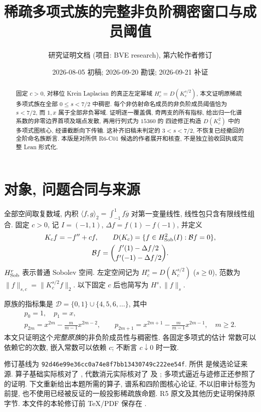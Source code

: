 \documentclass[UTF8]{ctexart}
\title{稀疏多项式族的完整非负阶稠密窗口与成员阈值}
\author{研究证明文档 (项目: BVE research), 第六轮作者修订}
\date{2026-08-05 初稿; 2026-09-20 勘误; 2026-09-21 补证}
\begin{document}
\maketitle

\begin{abstract}
固定 $c>0$, 对移位 Krein Laplacian 的真正左定幂域
$H_c^s=D(K_c^{s/2})$, 本文证明原稀疏多项式族在全部
$0\le s<7/2$ 中稠密. 每个非仿射命名成员的非负阶成员阈值恰为
$s<7/2$, 而 $1,x$ 属于全部非负幂域. 证明逐一覆盖偶, 奇两支的所有指标,
给出归一化谱系数的非零边界首项及端点发散, 再用行列式为 $15360$ 的
四迹修正构造 $D(K_c^2)$ 中的多项式图核心, 经谱截断向下传输.
这补齐旧稿未判定的 $3<s<7/2$, 不恢复已经撤回的全阶命名族断言.
本版是对所供 R6-C01 候选的作者展开和核查, 不是独立验收回执或完整 Lean 形式化.
\end{abstract}

\tableofcontents

\section{对象, 问题合同与来源}
全部空间取复数域, 内积 $\langle f,g\rangle_2=\int_{-1}^1f\overline g$
对第一变量线性, 线性包只含有限线性组合. 固定 $c>0$, 记 $I=(-1,1)$,
$\Delta f=f(1)-f(-1)$, 并定义
\begin{equation}\label{eq:operator-domain}
 \begin{gathered}
 K_cf=-f''+cf,\qquad D(K_c)=\{f\in H^2_{\rm Sob}(I):\mathcal Bf=0\},\\
 \mathcal Bf=\binom{f'(1)-\Delta f/2}{f'(-1)-\Delta f/2}.
 \end{gathered}
\end{equation}
$H^r_{\rm Sob}$ 表示普通 Sobolev 空间. 左定空间记为
$H_c^s=D(K_c^{s/2})$ ($s\ge0$), 范数为
$\|f\|_{s,c}=\|K_c^{s/2}f\|_2$. 以下固定 $c$ 后也简写为 $H^s,\|f\|_s$.

原族的指标集是 $\mathcal D=\{0,1\}\cup\{4,5,6,\ldots\}$, 其中
\begin{equation}\label{eq:original-family}
 \begin{gathered}
 p_0=1,\quad p_1=x,\\
 p_{2m}=x^{2m}-\frac m{m-1}x^{2m-2},\qquad
 p_{2m+1}=x^{2m+1}-\frac m{m-1}x^{2m-1},\quad m\ge2.
 \end{gathered}
\end{equation}
本文只证明这个\emph{完整原族}的非负阶成员性与稠密性. 各固定多项式的估计
常数可以依赖它的次数, 嵌入常数可以依赖 $c$; 不断言 $c\downarrow0$ 时一致.

修订基线为 \texttt{92d46e99e36cc0a74e8f7bb13430749c222ee54f}.
所供 \cite{r6candidate} 是候选论证来源. 算子基础实际核对了
\cite[第2节, R5-OP]{r5}, 代数消元实际核对了 \cite[第2.1节]{h2}
及 \cite{dc}; 多项式逼近与迹修正还参照了 \cite[STEP7--STEP8]{a7} 的证明.
下文重新给出本题所需的算子, 谱系和四阶图核心论证, 不以旧审计标签为前提,
也不使用已经被反证的一般投影稀疏族命题. R5 原文及其他历史证明保持原字节.
本文件的本轮修订前 TeX/PDF 保存在
.
\end{document}
